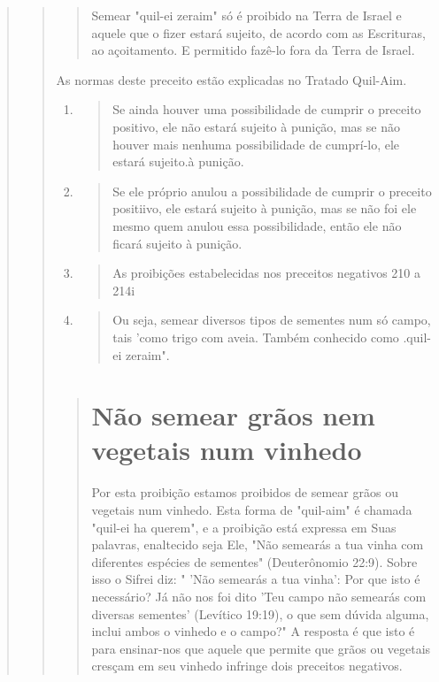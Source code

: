 \begin{quote}
\begin{quote}
\begin{quote}
Semear "quil-ei zeraim" só é proibido na Terra de Israel e aquele que o
fizer estará sujeito, de acordo com as Escrituras, ao açoitamento. E
per­mitido fazê-lo fora da Terra de Israel.
\end{quote}

As normas deste preceito estão explicadas no Tratado Quil-Aim.

\begin{enumerate}
\def\labelenumi{\arabic{enumi}.}
\setcounter{enumi}{384}
\item
 \begin{quote}
 Se ainda houver uma possibilidade de cumprir o preceito positivo, ele
 não estará sujeito à punição, mas se não houver mais nenhuma
 possibilidade de cumprí-lo, ele estará sujeito.à punição.
 \end{quote}
\item
 \begin{quote}
 Se ele próprio anulou a possibilidade de cumprir o preceito positiivo,
 ele estará sujeito à puni­ção, mas se não foi ele mesmo quem anulou
 essa possibilidade, então ele não ficará sujeito à punição.
 \end{quote}
\item
 \begin{quote}
 As proibições estabelecidas nos preceitos negativos 210 a 214i
 \end{quote}
\item
 \begin{quote}
 Ou seja, semear diversos tipos de sementes num só campo, tais 'como
 trigo com aveia. Tam­bém conhecido como .quil-ei
 zeraim".
 \end{quote}
\end{enumerate}

\begin{quote}

\section{Não semear grãos nem vegetais num vinhedo}

Por esta proibição estamos proibidos de semear grãos ou vegetais num
vinhedo. Esta forma de "quil-aim" é chamada "quil-ei ha querem", e a
proibição está expressa em Suas palavras, enaltecido seja Ele, "Não
semearás a tua vinha com diferentes espécies de sementes" (Deuterônomio
22:9). Sobre isso o Sifrei diz: " 'Não semearás a tua vinha': Por que
isto é necessário? Já não nos foi dito 'Teu campo não semearás com
diversas sementes' (Levítico 19:19), o que sem dúvida alguma, inclui
ambos o vinhedo e o campo?" A resposta é que isto é para ensinar-nos que
aquele que permite que grãos ou vegetais cres­çam em seu vinhedo
infringe dois preceitos negativos.


\end{quote}
\end{quote}
\end{quote}
